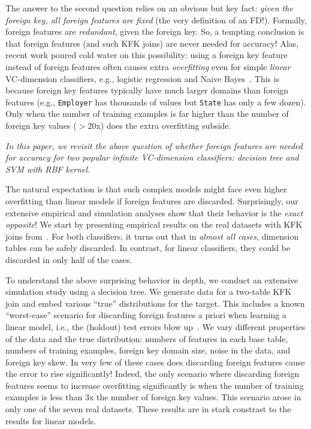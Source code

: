 \documentclass[sigconf]{acmart}
\begin{document}
The answer to the second question relies on an obvious but key fact: \textit{given the foreign key, all foreign features are fixed} (the very definition of an FD!).
Formally, foreign features are \textit{redundant}, given the foreign key. 
So, a tempting conclusion is that foreign features (and such KFK joins) are never needed for accuracy! Alas, recent work poured cold water
on this possibility: using a foreign key feature instead of foreign features often causes extra \textit{overfitting} even for simple \textit{linear} VC-dimension classifiers,
e.g., logistic regression and Naive Bayes~\cite{hamlet}. This is because foreign key features typically have much larger domains than foreign features (e.g., 
\texttt{Employer} has thousands of values but \texttt{State} has only a few dozen). 
Only when the number of training examples is far higher than the number of foreign key values ($>20$x) does the extra overfitting subside.

\textit{In this paper, we revisit the above question of whether foreign features are needed for accuracy for two popular \textit{infinite} VC-dimension classifiers: 
decision tree and SVM with RBF kernel.}

The natural expectation is that such complex models might face even higher overfitting than linear models if foreign features are discarded. 
Surprisingly, our extensive empirical and simulation analyses show that their behavior is the \textit{exact opposite}! We start by presenting empirical results on the 
real datasets with KFK joins from~\cite{hamlet}. For both classifiers, it turns out that in \textit{almost all cases}, dimension tables can be safely 
discarded. In contrast, for linear classifiers, they could be discarded in only half of the cases.

To understand the above surprising behavior in depth, we conduct an extensive simulation study using a decision tree. We generate data for a two-table KFK join 
and embed various ``true'' distributions for the target. This includes a known ``worst-case'' scenario for discarding foreign features a priori when learning a linear model, 
i.e., the (holdout) test errors blow up~\cite{hamlet}. We vary different properties of the data and the true distribution: 
numbers of features in each base table, numbers of training examples, foreign key domain size, noise in the data, and foreign key skew. 
In very few of these cases does discarding foreign features cause the error to rise significantly! Indeed, the only scenario where discarding foreign features seems to increase 
overfitting significantly is when the number of training examples is less than $3$x the number of foreign key values. This scenario arose in only one of the seven real datasets.
These results are in stark constrast to the results for linear models.
\end{document}
